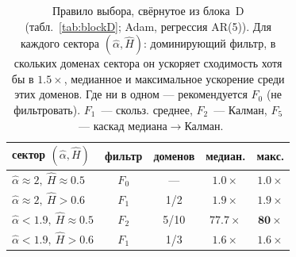 \begin{table}[t]
\caption{Правило выбора, свёрнутое из блока~D (табл.~\ref{tab:blockD}; Adam, регрессия AR(5)). Для каждого сектора $(\hat\alpha,\hat H)$: доминирующий фильтр, в скольких доменах сектора он ускоряет сходимость хотя бы в $1.5\times$, медианное и максимальное ускорение среди этих доменов. Где ни в одном --- рекомендуется $F_0$ (не фильтровать). $F_1$~--- скольз. среднее, $F_2$~--- Калман, $F_5$~--- каскад медиана$\to$Калман.}
\label{tab:rules}
\centering\begin{tabular}{lcccc}
\toprule
сектор $(\hat\alpha,\hat H)$ & фильтр & доменов & медиан. & макс.\\
\midrule
$\hat\alpha{\approx}2,\ \hat H{\approx}0.5$ & $F_0$ & --- & $1.0\times$ & $1.0\times$\\
$\hat\alpha{\approx}2,\ \hat H{>}0.6$ & $F_1$ & 1/2 & $1.9\times$ & $1.9\times$\\
$\hat\alpha{<}1.9,\ \hat H{\approx}0.5$ & $F_2$ & 5/10 & $77.7\times$ & $\mathbf{80\times}$\\
$\hat\alpha{<}1.9,\ \hat H{>}0.6$ & $F_1$ & 1/3 & $1.6\times$ & $1.6\times$\\
\bottomrule
\end{tabular}\end{table}
